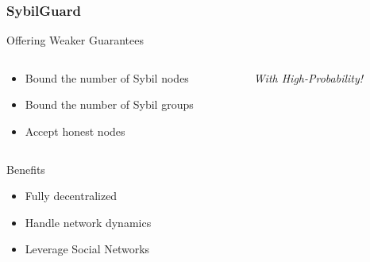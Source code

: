 \documentclass{beamer}
\begin{document}
\begin{frame}

  \frametitle{SybilGuard}

  \begin{block}{Offering Weaker Guarantees}

    \begin{columns}

      \begin{column}{7cm}
	\begin{itemize}
	\item Bound the number of Sybil nodes
	\item Bound the number of Sybil groups
	\item Accept honest nodes
	\end{itemize}
      \end{column}

      \begin{column}{4cm}
	\vfill
	{\it With High-Probability!}
	\vfill
      \end{column}

    \end{columns}

  \end{block}

  \begin{block}{Benefits}

    \begin{itemize}
      \item Fully decentralized
      \item Handle network dynamics
      \item Leverage Social Networks
    \end{itemize}

  \end{block}

\end{frame}

\end{document}
